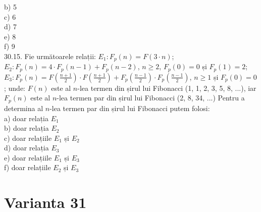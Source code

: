 \begin{itemize}
\begin{enumerate}
b) 5
\\
c) 6
\\
d) 7
\\
e) 8
\\
f) 9
\\
30.15. Fie următoarele relații:
$E_{1}: F_{p}(n)=F(3 \cdot n)$;
$E_{2}: F_{p}(n)=4 \cdot F_{p}(n-1)+F_{p}(n-2)$, $n \geq 2$, $F_{p}(0)=0$ și $F_{p}(1)=2$;
$E_{3}: F_{p}(n)=F\left(\frac{n+1}{2}\right) \cdot F\left(\frac{n+1}{2}\right)+F_{p}\left(\frac{n-1}{2}\right) \cdot F_{p}\left(\frac{n-1}{2}\right)$, $n \geq 1$ și $F_{p}(0)=0$;
unde: $F(n)$ este al $n$-lea termen din șirul lui Fibonacci (1, 1, 2, 3, 5, 8, ...), iar $F_{p}(n)$ este al $n$-lea termen par din șirul lui Fibonacci (2, 8, 34, ...) Pentru a determina al $n$-lea termen par din șirul lui Fibonacci putem folosi:
\\
a) doar relația $E_{1}$
\\
b) doar relația $E_{2}$
\\
c) doar relațiile $E_{1}$ și $E_{2}$
\\
d) doar relația $E_{3}$
\\
e) doar relațiile $E_{1}$ și $E_{3}$
\\
f) doar relațiile $E_{2}$ și $E_{3}$
\\

\section*{Varianta 31}


\end{enumerate}
\end{itemize}
